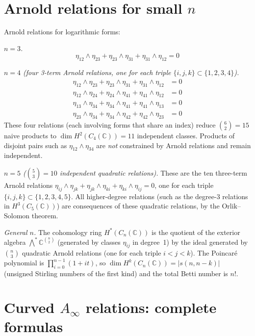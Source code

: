 \chapter{\texorpdfstring{Arnold relations for small $n$}{Arnold relations for small n}}
\label{app:arnold-relations-small-n}

Arnold relations for logarithmic forms:

\emph{$n = 3$.}
\[
\eta_{12} \wedge \eta_{23} + \eta_{23} \wedge \eta_{31} + \eta_{31} \wedge \eta_{12} = 0
\]

\emph{$n = 4$ (four 3-term Arnold relations, one for each triple $\{i,j,k\} \subset \{1,2,3,4\}$).}
\begin{align*}
\eta_{12} \wedge \eta_{23} + \eta_{23} \wedge \eta_{31} + \eta_{31} \wedge \eta_{12} &= 0 \\
\eta_{12} \wedge \eta_{24} + \eta_{24} \wedge \eta_{41} + \eta_{41} \wedge \eta_{12} &= 0 \\
\eta_{13} \wedge \eta_{34} + \eta_{34} \wedge \eta_{41} + \eta_{41} \wedge \eta_{13} &= 0 \\
\eta_{23} \wedge \eta_{34} + \eta_{34} \wedge \eta_{42} + \eta_{42} \wedge \eta_{23} &= 0
\end{align*}
These four relations (each involving forms that share an index) reduce $\binom{6}{2} = 15$ naive products to $\dim H^2(C_4(\mathbb{C})) = 11$ independent classes. Products of disjoint pairs such as $\eta_{12} \wedge \eta_{34}$ are \emph{not} constrained by Arnold relations and remain independent.

\emph{$n = 5$ ($\binom{5}{3} = 10$ independent quadratic relations).}
These are the ten three-term Arnold relations $\eta_{ij} \wedge \eta_{jk} + \eta_{jk} \wedge \eta_{ki} + \eta_{ki} \wedge \eta_{ij} = 0$, one for each triple $\{i,j,k\} \subset \{1,2,3,4,5\}$. All higher-degree relations (such as the degree-3 relations in $H^3(C_5(\mathbb{C}))$) are consequences of these quadratic relations, by the Orlik--Solomon theorem.

\emph{General $n$.} The cohomology ring $H^*(C_n(\mathbb{C}))$ is the quotient of the
exterior algebra $\bigwedge^* \mathbb{C}^{\binom{n}{2}}$ (generated by classes $\eta_{ij}$ in degree~1)
by the ideal generated by $\binom{n}{3}$ quadratic Arnold relations (one for each triple $i < j < k$).
The Poincar\'{e} polynomial is $\prod_{i=0}^{n-1}(1 + it)$, so
$\dim H^k(C_n(\mathbb{C})) = |s(n, n-k)|$ (unsigned Stirling numbers of the first kind)
and the total Betti number is $n!$.


\chapter{\texorpdfstring{Curved $A_\infty$ relations: complete formulas}{Curved A infty relations: complete formulas}}
\label{app:curved-ainfty-formulas}

